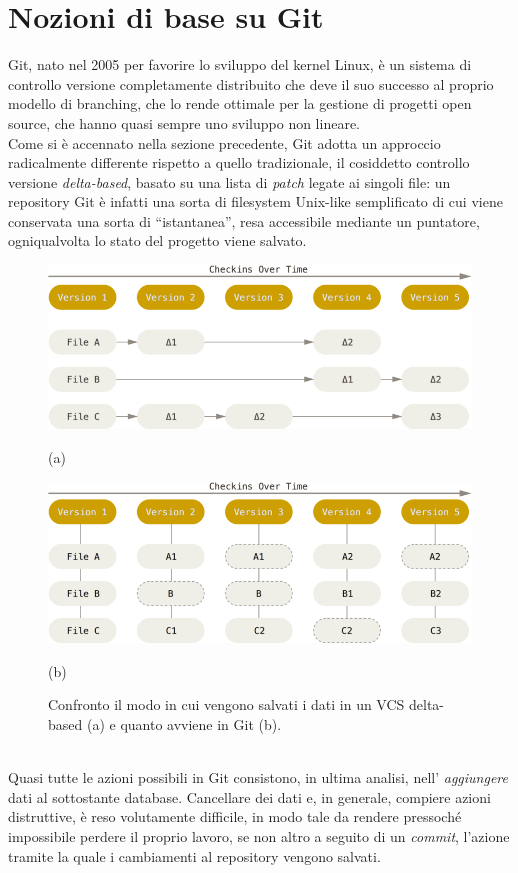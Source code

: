\documentclass[12pt]{article}
\def\quote#1{``#1''}
\begin{document}
\section{Nozioni di base su Git}
Git, nato nel 2005 per favorire lo sviluppo del kernel Linux, è un sistema di controllo versione completamente distribuito che deve il suo successo al proprio modello di branching, che lo rende ottimale per la gestione di progetti open source, che hanno quasi sempre uno sviluppo non lineare.
\bigskip \\
Come si è accennato nella sezione precedente, Git adotta un approccio radicalmente differente rispetto a quello tradizionale, il cosiddetto controllo versione \textit{delta-based}, basato su una lista di \textit{patch} legate ai singoli file: un repository Git è infatti una sorta di filesystem Unix-like semplificato di cui viene conservata una sorta di \quote{istantanea}, resa accessibile mediante un puntatore, ogniqualvolta lo stato del progetto viene salvato.
\begin{figure}[h]
	\centering
	\includegraphics[width=13cm]{delta-based.png}
	\caption*{(a)\bigskip}
	\includegraphics[width=13cm]{snapshots-based.png}
	\caption*{(b)}
	\caption{Confronto il modo in cui vengono salvati i dati in un VCS delta-based (a) e quanto avviene in Git (b).}
\end{figure}
\bigskip \\
Quasi tutte le azioni possibili in Git consistono, in ultima analisi, nell' \textit{aggiungere} dati al sottostante database. Cancellare dei dati e, in generale, compiere azioni distruttive, è reso volutamente difficile, in modo tale da rendere pressoché impossibile perdere il proprio lavoro, se non altro a seguito di un \textit{commit}, l'azione tramite la quale i cambiamenti al repository vengono salvati.
\end{document}
